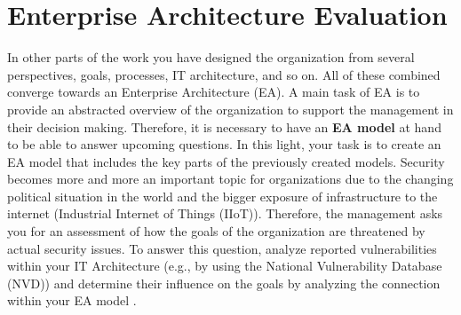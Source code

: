
\section{Enterprise Architecture Evaluation} \label{sec:vulnerabilities}

In other parts of the work you have designed the organization from several perspectives, goals, processes, IT architecture, and so
on.
All of these combined converge towards an Enterprise Architecture (EA).
A main task of EA is to provide an abstracted overview of the organization to support the management in their decision making.
Therefore, it is necessary to have an \textbf{EA model} at hand to be able to answer upcoming questions.
In this light, your task is to create an EA model that includes the key parts of the previously created models.
Security becomes more and more an important topic for organizations due to the changing political situation in the world and the
bigger exposure of infrastructure to the internet (Industrial Internet of Things (IIoT)).
Therefore, the management asks you for an assessment of how the goals of the organization are threatened by actual security
issues.
To answer this question, analyze reported vulnerabilities within your IT Architecture (e.g., by using the National Vulnerability
Database (NVD)) and determine their influence on the goals by analyzing the connection within your EA model
\cite{Ebbers2021_IIoTVulnerabilities}.
